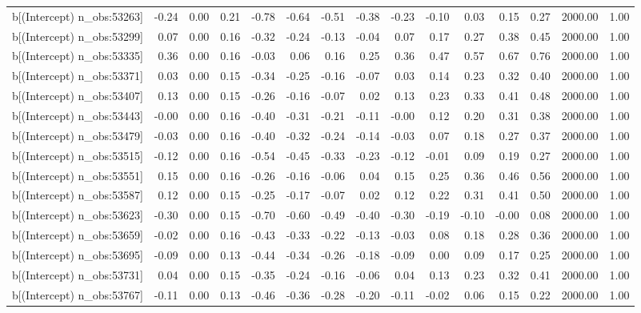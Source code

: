 \begin{table}[ht]
\begin{tabular}{rrrrrrrrrrrrrrr}
  b[(Intercept) n\_obs:53263] & -0.24 & 0.00 & 0.21 & -0.78 & -0.64 & -0.51 & -0.38 & -0.23 & -0.10 & 0.03 & 0.15 & 0.27 & 2000.00 & 1.00 \\ 
  b[(Intercept) n\_obs:53299] & 0.07 & 0.00 & 0.16 & -0.32 & -0.24 & -0.13 & -0.04 & 0.07 & 0.17 & 0.27 & 0.38 & 0.45 & 2000.00 & 1.00 \\ 
  b[(Intercept) n\_obs:53335] & 0.36 & 0.00 & 0.16 & -0.03 & 0.06 & 0.16 & 0.25 & 0.36 & 0.47 & 0.57 & 0.67 & 0.76 & 2000.00 & 1.00 \\ 
  b[(Intercept) n\_obs:53371] & 0.03 & 0.00 & 0.15 & -0.34 & -0.25 & -0.16 & -0.07 & 0.03 & 0.14 & 0.23 & 0.32 & 0.40 & 2000.00 & 1.00 \\ 
  b[(Intercept) n\_obs:53407] & 0.13 & 0.00 & 0.15 & -0.26 & -0.16 & -0.07 & 0.02 & 0.13 & 0.23 & 0.33 & 0.41 & 0.48 & 2000.00 & 1.00 \\ 
  b[(Intercept) n\_obs:53443] & -0.00 & 0.00 & 0.16 & -0.40 & -0.31 & -0.21 & -0.11 & -0.00 & 0.12 & 0.20 & 0.31 & 0.38 & 2000.00 & 1.00 \\ 
  b[(Intercept) n\_obs:53479] & -0.03 & 0.00 & 0.16 & -0.40 & -0.32 & -0.24 & -0.14 & -0.03 & 0.07 & 0.18 & 0.27 & 0.37 & 2000.00 & 1.00 \\ 
  b[(Intercept) n\_obs:53515] & -0.12 & 0.00 & 0.16 & -0.54 & -0.45 & -0.33 & -0.23 & -0.12 & -0.01 & 0.09 & 0.19 & 0.27 & 2000.00 & 1.00 \\ 
  b[(Intercept) n\_obs:53551] & 0.15 & 0.00 & 0.16 & -0.26 & -0.16 & -0.06 & 0.04 & 0.15 & 0.25 & 0.36 & 0.46 & 0.56 & 2000.00 & 1.00 \\ 
  b[(Intercept) n\_obs:53587] & 0.12 & 0.00 & 0.15 & -0.25 & -0.17 & -0.07 & 0.02 & 0.12 & 0.22 & 0.31 & 0.41 & 0.50 & 2000.00 & 1.00 \\ 
  b[(Intercept) n\_obs:53623] & -0.30 & 0.00 & 0.15 & -0.70 & -0.60 & -0.49 & -0.40 & -0.30 & -0.19 & -0.10 & -0.00 & 0.08 & 2000.00 & 1.00 \\ 
  b[(Intercept) n\_obs:53659] & -0.02 & 0.00 & 0.16 & -0.43 & -0.33 & -0.22 & -0.13 & -0.03 & 0.08 & 0.18 & 0.28 & 0.36 & 2000.00 & 1.00 \\ 
  b[(Intercept) n\_obs:53695] & -0.09 & 0.00 & 0.13 & -0.44 & -0.34 & -0.26 & -0.18 & -0.09 & 0.00 & 0.09 & 0.17 & 0.25 & 2000.00 & 1.00 \\ 
  b[(Intercept) n\_obs:53731] & 0.04 & 0.00 & 0.15 & -0.35 & -0.24 & -0.16 & -0.06 & 0.04 & 0.13 & 0.23 & 0.32 & 0.41 & 2000.00 & 1.00 \\ 
  b[(Intercept) n\_obs:53767] & -0.11 & 0.00 & 0.13 & -0.46 & -0.36 & -0.28 & -0.20 & -0.11 & -0.02 & 0.06 & 0.15 & 0.22 & 2000.00 & 1.00 \\ 

\end{tabular}
\end{table}
